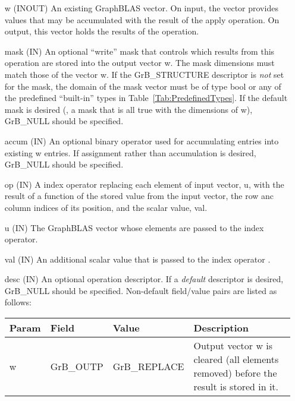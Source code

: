 \begin{itemize}[leftmargin=1.1in]
    \item[{\sf w}]    ({\sf INOUT}) An existing GraphBLAS vector.  On input,
    the vector provides values that may be accumulated with the result of the
    apply operation.  On output, this vector holds the results of the
    operation.

    \item[{\sf mask}] ({\sf IN}) An optional ``write'' mask that controls which
    results from this operation are stored into the output vector {\sf w}. The 
    mask dimensions must match those of the vector {\sf w}. If the 
    {\sf GrB\_STRUCTURE} descriptor is {\em not} set for the mask, the domain of the
    {\sf mask} vector must be of type {\sf bool} or any of the predefined 
    ``built-in'' types in Table~\ref{Tab:PredefinedTypes}.  If the default
    mask is desired (\ie, a mask that is all {\sf true} with the dimensions of {\sf w}), 
    {\sf GrB\_NULL} should be specified.

    \item[{\sf accum}] ({\sf IN}) An optional binary operator used for accumulating
    entries into existing {\sf w} entries. If assignment rather than accumulation is
    desired, {\sf GrB\_NULL} should be specified.

    \item[{\sf op}] ({\sf IN}) A index operator replacing each element of input 
    vector, {\sf u}, with the result of a function of the stored value from the input vector, 
	the row anc column indices of its position, and the scalar value, {\sf val}.

    \item[{\sf u}] ({\sf IN}) The GraphBLAS vector whose elements are passed 
    to the index operator.

    \item[{\sf val}] ({\sf IN}) An additional scalar value that is passed to the 
	index operator .
    
    \item[{\sf desc}] ({\sf IN}) An optional operation descriptor. If
    a \emph{default} descriptor is desired, {\sf GrB\_NULL} should be
    specified. Non-default field/value pairs are listed as follows:  \\

    \hspace*{-2em}\begin{tabular}{lllp{2.7in}}
        Param & Field  & Value & Description \\
        \hline
        {\sf w}    & {\sf GrB\_OUTP} & {\sf GrB\_REPLACE} & Output vector {\sf w}
        is cleared (all elements removed) before the result is stored in it.\\


\end{tabular}
\end{itemize}
